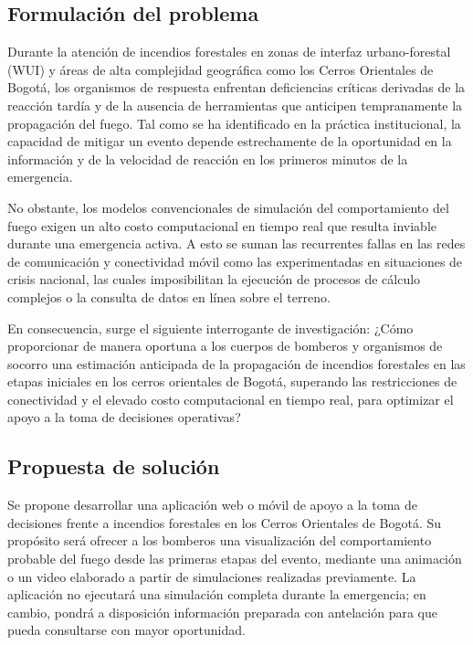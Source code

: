   
\subsection{Formulación del problema}

Durante la atención de incendios forestales en zonas de interfaz urbano-forestal (WUI) y áreas de alta complejidad geográfica como los Cerros Orientales de Bogotá, los organismos de respuesta enfrentan deficiencias críticas derivadas de la reacción tardía y de la ausencia de herramientas que anticipen tempranamente la propagación del fuego. Tal como se ha identificado en la práctica institucional, la capacidad de mitigar un evento depende estrechamente de la oportunidad en la información y de la velocidad de reacción en los primeros minutos de la emergencia. 

No obstante, los modelos convencionales de simulación del comportamiento del fuego exigen un alto costo computacional en tiempo real que resulta inviable durante una emergencia activa. A esto se suman las recurrentes fallas en las redes de comunicación y conectividad móvil como las experimentadas en situaciones de crisis nacional, las cuales imposibilitan la ejecución de procesos de cálculo complejos o la consulta de datos en línea sobre el terreno. 

En consecuencia, surge el siguiente interrogante de investigación: ¿Cómo proporcionar de manera oportuna a los cuerpos de bomberos y organismos de socorro una estimación anticipada de la propagación de incendios forestales en las etapas iniciales en los cerros orientales de Bogotá, superando las restricciones de conectividad y el elevado costo computacional en tiempo real, para optimizar el apoyo a la toma de decisiones operativas?

  

\subsection{Propuesta de solución}

Se propone desarrollar una aplicación web o móvil de apoyo a la toma de decisiones frente a incendios forestales en los Cerros Orientales de Bogotá. Su propósito será ofrecer a los bomberos una visualización del comportamiento probable del fuego desde las primeras etapas del evento, mediante una animación o un video elaborado a partir de simulaciones realizadas previamente. La aplicación no ejecutará una simulación completa durante la emergencia; en cambio, pondrá a disposición información preparada con antelación para que pueda consultarse con mayor oportunidad.

